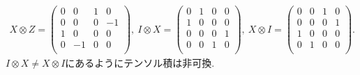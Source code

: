 \begin{ex}
    \label{ex2.27}
    \begin{align*}
        X \otimes Z
        =
        \begin{pmatrix}
            0 & 0  & 1 & 0  \\
            0 & 0  & 0 & -1 \\
            1 & 0  & 0 & 0  \\
            0 & -1 & 0 & 0  \\
        \end{pmatrix}
        , \
        I \otimes X
        =
        \begin{pmatrix}
            0 & 1 & 0 & 0 \\
            1 & 0 & 0 & 0 \\
            0 & 0 & 0 & 1 \\
            0 & 0 & 1 & 0 \\
        \end{pmatrix}
        , \
        X \otimes I
        =
        \begin{pmatrix}
            0 & 0 & 1 & 0 \\
            0 & 0 & 0 & 1 \\
            1 & 0 & 0 & 0 \\
            0 & 1 & 0 & 0 \\
        \end{pmatrix}.
    \end{align*}
    $I \otimes X \neq X \otimes I$にあるようにテンソル積は非可換.
\end{ex}

